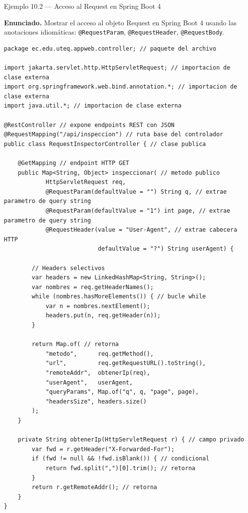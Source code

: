 \begin{cajaejemplo}{Ejemplo 10.2 --- Acceso al Request en Spring Boot 4}

\textbf{Enunciado.} Mostrar el acceso al objeto Request en Spring Boot 4 usando las anotaciones idiomáticas: \texttt{@RequestParam}, \texttt{@RequestHeader}, \texttt{@RequestBody}.

\begin{lstlisting}[style=java,caption={RequestInspectorController.java},label=lst:10.5]
package ec.edu.uteq.appweb.controller; // paquete del archivo

import jakarta.servlet.http.HttpServletRequest; // importacion de clase externa
import org.springframework.web.bind.annotation.*; // importacion de clase externa
import java.util.*; // importacion de clase externa

@RestController // expone endpoints REST con JSON
@RequestMapping("/api/inspeccion") // ruta base del controlador
public class RequestInspectorController { // clase publica

    @GetMapping // endpoint HTTP GET
    public Map<String, Object> inspeccionar( // metodo publico
            HttpServletRequest req,
            @RequestParam(defaultValue = "") String q, // extrae parametro de query string
            @RequestParam(defaultValue = "1") int page, // extrae parametro de query string
            @RequestHeader(value = "User-Agent", // extrae cabecera HTTP
                           defaultValue = "?") String userAgent) {

        // Headers selectivos
        var headers = new LinkedHashMap<String, String>();
        var nombres = req.getHeaderNames();
        while (nombres.hasMoreElements()) { // bucle while
            var n = nombres.nextElement();
            headers.put(n, req.getHeader(n));
        }

        return Map.of( // retorna
            "metodo",      req.getMethod(),
            "url",         req.getRequestURL().toString(),
            "remoteAddr",  obtenerIp(req),
            "userAgent",   userAgent,
            "queryParams", Map.of("q", q, "page", page),
            "headersSize", headers.size()
        );
    }

    private String obtenerIp(HttpServletRequest r) { // campo privado
        var fwd = r.getHeader("X-Forwarded-For");
        if (fwd != null && !fwd.isBlank()) { // condicional
            return fwd.split(",")[0].trim(); // retorna
        }
        return r.getRemoteAddr(); // retorna
    }
}
\end{lstlisting}
\end{cajaejemplo}

